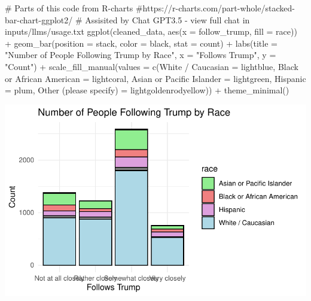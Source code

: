 \documentclass[
  letterpaper,
  DIV=11,
  numbers=noendperiod]{scrartcl}
\newenvironment{Shaded}{\begin{snugshade}}{\end{snugshade}}
\newcommand{\AttributeTok}[1]{\textcolor[rgb]{0.40,0.45,0.13}{#1}}
\newcommand{\CommentTok}[1]{\textcolor[rgb]{0.37,0.37,0.37}{#1}}
\newcommand{\FunctionTok}[1]{\textcolor[rgb]{0.28,0.35,0.67}{#1}}
\newcommand{\NormalTok}[1]{\textcolor[rgb]{0.00,0.23,0.31}{#1}}
\newcommand{\OtherTok}[1]{\textcolor[rgb]{0.00,0.23,0.31}{#1}}
\newcommand{\SpecialCharTok}[1]{\textcolor[rgb]{0.37,0.37,0.37}{#1}}
\newcommand{\StringTok}[1]{\textcolor[rgb]{0.13,0.47,0.30}{#1}}
\begin{document}
\begin{Shaded}
\begin{Highlighting}[]
\CommentTok{\# Parts of this code from R{-}charts}
\CommentTok{\#https://r{-}charts.com/part{-}whole/stacked{-}bar{-}chart{-}ggplot2/}
\CommentTok{\# Assisited by Chat GPT3.5 {-} view full chat in inputs/llms/usage.txt}
\FunctionTok{ggplot}\NormalTok{(cleaned\_data, }\FunctionTok{aes}\NormalTok{(}\AttributeTok{x =}\NormalTok{ follow\_trump, }\AttributeTok{fill =}\NormalTok{ race)) }\SpecialCharTok{+}
  \FunctionTok{geom\_bar}\NormalTok{(}\AttributeTok{position =} \StringTok{\textquotesingle{}stack\textquotesingle{}}\NormalTok{, }\AttributeTok{color =} \StringTok{\textquotesingle{}black\textquotesingle{}}\NormalTok{, }\AttributeTok{stat =} \StringTok{\textquotesingle{}count\textquotesingle{}}\NormalTok{) }\SpecialCharTok{+}
  \FunctionTok{labs}\NormalTok{(}\AttributeTok{title =} \StringTok{"Number of People Following Trump by Race"}\NormalTok{,}
       \AttributeTok{x =} \StringTok{"Follows Trump"}\NormalTok{,}
       \AttributeTok{y =} \StringTok{"Count"}\NormalTok{) }\SpecialCharTok{+}
  \FunctionTok{scale\_fill\_manual}\NormalTok{(}\AttributeTok{values =} \FunctionTok{c}\NormalTok{(}\StringTok{\textquotesingle{}White / Caucasian\textquotesingle{}} \OtherTok{=} \StringTok{\textquotesingle{}lightblue\textquotesingle{}}\NormalTok{, }\StringTok{\textquotesingle{}Black or African American\textquotesingle{}} \OtherTok{=} \StringTok{\textquotesingle{}lightcoral\textquotesingle{}}\NormalTok{, }\StringTok{\textquotesingle{}Asian or Pacific Islander\textquotesingle{}} \OtherTok{=} \StringTok{\textquotesingle{}lightgreen\textquotesingle{}}\NormalTok{, }\StringTok{\textquotesingle{}Hispanic\textquotesingle{}} \OtherTok{=} \StringTok{\textquotesingle{}plum\textquotesingle{}}\NormalTok{,}
                               \StringTok{\textquotesingle{}Other  (please specify)\textquotesingle{}} \OtherTok{=} \StringTok{\textquotesingle{}lightgoldenrodyellow\textquotesingle{}}\NormalTok{)) }\SpecialCharTok{+}
  \FunctionTok{theme\_minimal}\NormalTok{()}
\end{Highlighting}
\end{Shaded}

\includegraphics{paper_files/figure-pdf/unnamed-chunk-5-1.pdf}
\end{document}
